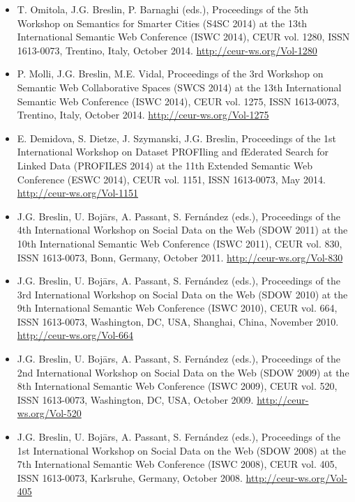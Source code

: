 \documentclass[10pt,a4paper]{res} %
\begin{document}
\begin{resume}
\begin{itemize}
\item T. Omitola, J.G. Breslin, P. Barnaghi (eds.), Proceedings of the 5th Workshop on Semantics for Smarter Cities (S4SC 2014) at the 13th International Semantic Web Conference (ISWC 2014), CEUR vol. 1280, ISSN 1613-0073, Trentino, Italy, October 2014. \url{http://ceur-ws.org/Vol-1280}
\item P. Molli, J.G. Breslin, M.E. Vidal, Proceedings of the 3rd Workshop on Semantic Web Collaborative Spaces (SWCS 2014) at the 13th International Semantic Web Conference (ISWC 2014), CEUR vol. 1275, ISSN 1613-0073, Trentino, Italy, October 2014.  \url{http://ceur-ws.org/Vol-1275}
\item E. Demidova, S. Dietze, J. Szymanski, J.G. Breslin, Proceedings of the 1st International Workshop on Dataset PROFIling and fEderated Search for Linked Data (PROFILES 2014) at the 11th Extended Semantic Web Conference (ESWC 2014), CEUR vol. 1151, ISSN 1613-0073, May 2014. \url{http://ceur-ws.org/Vol-1151}
\item J.G. Breslin, U. Boj\={a}rs, A. Passant, S. Fern\'{a}ndez (eds.), Proceedings of the 4th International Workshop on Social Data on the Web (SDOW 2011) at the 10th International Semantic Web Conference (ISWC 2011), CEUR vol. 830, ISSN 1613-0073, Bonn, Germany, October 2011. \url{http://ceur-ws.org/Vol-830}
\item J.G. Breslin, U. Boj\={a}rs, A. Passant, S. Fern\'{a}ndez (eds.), Proceedings of the 3rd International Workshop on Social Data on the Web (SDOW 2010) at the 9th International Semantic Web Conference (ISWC 2010), CEUR vol. 664, ISSN 1613-0073, Washington, DC, USA, Shanghai, China, November 2010. \url{http://ceur-ws.org/Vol-664}
\item J.G. Breslin, U. Boj\={a}rs, A. Passant, S. Fern\'{a}ndez (eds.), Proceedings of the 2nd International Workshop on Social Data on the Web (SDOW 2009) at the 8th International Semantic Web Conference (ISWC 2009), CEUR vol. 520, ISSN 1613-0073, Washington, DC, USA, October 2009. \url{http://ceur-ws.org/Vol-520}
\item J.G. Breslin, U. Boj\={a}rs, A. Passant, S. Fern\'{a}ndez (eds.), Proceedings of the 1st International Workshop on Social Data on the Web (SDOW 2008) at the 7th International Semantic Web Conference (ISWC 2008), CEUR vol. 405, ISSN 1613-0073, Karlsruhe, Germany, October 2008. \url{http://ceur-ws.org/Vol-405}

\end{itemize}
\end{resume}
\end{document}
